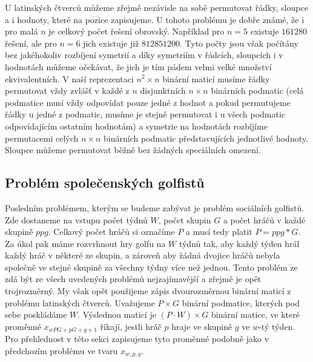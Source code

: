 U latinských čtverců můžeme zřejmě nezávisle na sobě permutovat řádky, sloupce a i hodnoty, které na pozice zapisujeme. U tohoto problému je dobře známé, že i pro malá $n$ je celkový počet řešení obrovský. Například pro $n=5$ existuje $161280$ řešení, ale pro $n=6$ jich existuje již $812851200$. Tyto počty jsou však počítány bez jakéhokoliv rozbíjení symetrií a díky symetriím v řádcích, sloupcích i v hodnotách můžeme očekávat, že jich je tím pádem velmi velké množství ekvivalentních. V naší reprezentaci $n^2\times n$ binární maticí musíme řádky permutovat vždy zvlášť v každé z $n$ disjunktních $n\times n$ binárních podmatic (celá podmatice musí vždy odpovídat pouze jedné z hodnot a pokud permutujeme řádky u jedné z podmatic, musíme je stejně permutovat i u všech podmatic odpovídajícím ostatním hodnotám) a symetrie na hodnotách rozbíjíme permutacemi celých $n\times n$ binárních podmatic představujících jednotlivé hodnoty. Sloupce můžeme permutovat běžně bez žádných speciálních omezení.
\subsection{Problém společenských golfistů}
Posledním problémem, kterým se budeme zabývat je problém sociálních golfistů. Zde dostaneme na vstupu počet týdnů $W$, počet skupin $G$ a počet hráčů v každé skupině $ppg$. Celkový počet hráčů si označíme $P$ a musí tedy platit $P=ppg*G$. Za úkol pak máme rozvrhnout hry golfu na $W$ týdnů tak, aby každý týden hrál každý hráč v některé ze skupin, a zároveň aby žádná dvojice hráčů nebyla společně ve stejné skupině za všechny týdny více než jednou. Tento problém ze zdá být ze všech uvedených problémů nejzajímavější a zřejmě je opět trojrozměrný. My však opět použijeme zápis dvourozměrnou binární maticí z problému latinských čtverců. Uvažujeme $P\times G$ binární podmatice, kterých pod sebe poskládáme $W$. Výslednou maticí je $(P\cdot W)\times G$ binární matice, ve které proměnné $x_{wPG+pG+g+1}$ říkají, jestli hráč $p$ hraje ve skupině $g$ ve $w$-tý týden. Pro přehlednost v této sekci zapisujeme tyto proměnné podobně jako v předchozím problému ve tvaru $x_{w,p,g}$.

